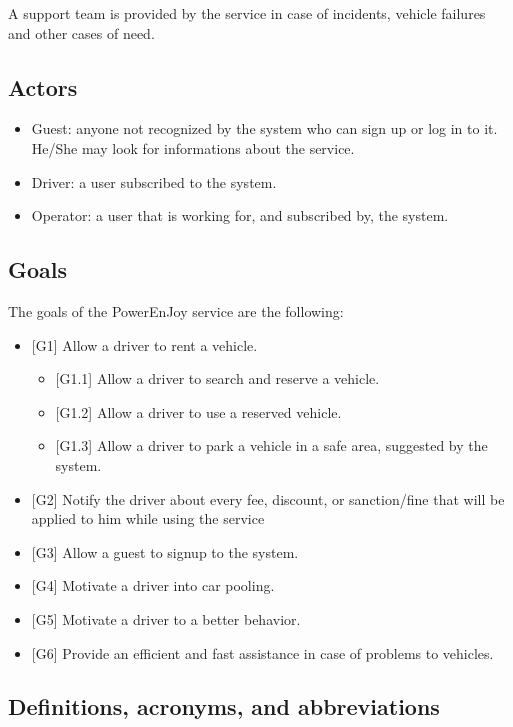 A support team is provided by the service in case of incidents, vehicle failures and other cases of need.

\subsection{Actors}
\begin{itemize}
	\item Guest: anyone not recognized by the system who can sign up or log in to it. He/She may look for informations about the service.
	\item Driver: a user subscribed to the system.
	\item Operator: a user that is working for, and subscribed by, the system.
\end{itemize}

\subsection{Goals}
The goals of the PowerEnJoy service are the following:
\begin{itemize}
	\item {[G1]} Allow a driver to rent a vehicle. 
	\begin{itemize}
		\item {[G1.1]} Allow a driver to search and reserve a vehicle. 
		\item {[G1.2]} Allow a driver to use a reserved vehicle. 
		\item {[G1.3]} Allow a driver to park a vehicle in a safe area, suggested by the system.
	\end{itemize}
	\item {[G2]} Notify the driver about every fee, discount, or sanction/fine that will be applied to him while using the service 
	\item {[G3]} Allow a guest to signup to the system. 
	\item {[G4]} Motivate a driver into car pooling. 
	\item {[G5]} Motivate a driver to a better behavior. 
	\item {[G6]} Provide an efficient and fast assistance in case of problems to vehicles. 
\end{itemize}

\subsection{Definitions, acronyms, and abbreviations}

